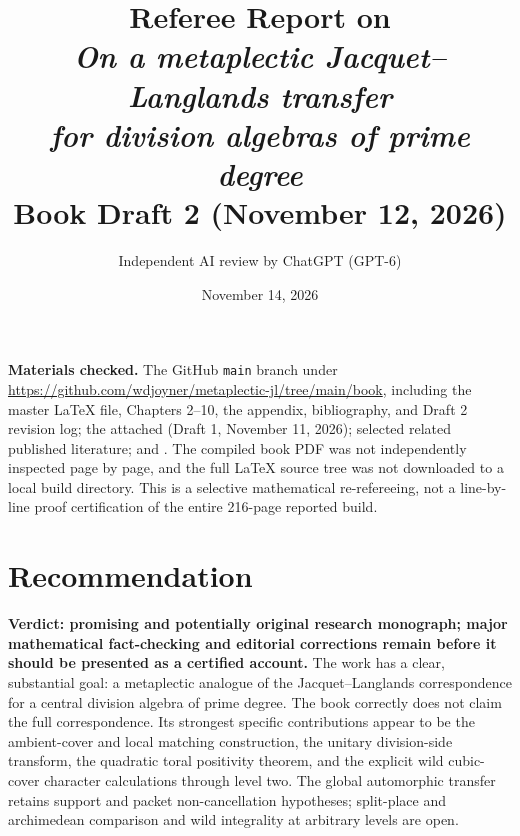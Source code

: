 \documentclass[12pt,letterpaper]{article}
\title{Referee Report on\\\emph{On a metaplectic Jacquet--Langlands transfer\\for division algebras of prime degree}\\[.5em]\large Book Draft 2 (November 12, 2026)}
\author{Independent AI review by ChatGPT (GPT-6)}
\date{November 14, 2026}
\begin{document}
\maketitle
\noindent\textbf{Materials checked.} The GitHub \texttt{main} branch under
\url{https://github.com/wdjoyner/metaplectic-jl/tree/main/book},
including the master LaTeX file, Chapters 2--10, the appendix, bibliography,
and Draft 2 revision log; the attached 
(Draft 1, November 11, 2026); selected related published literature; and
.
The compiled book PDF was not independently inspected page by page, and the
full LaTeX source tree was not downloaded to a local build directory.
This is a selective mathematical re-refereeing, not a line-by-line proof
certification of the entire 216-page reported build.

\section{Recommendation}
\textbf{Verdict: promising and potentially original research monograph;
major mathematical fact-checking and editorial corrections remain before
it should be presented as a certified account.}
The work has a clear, substantial goal: a metaplectic analogue of the
Jacquet--Langlands correspondence for a central division algebra of prime
degree. The book correctly does not claim the full correspondence. Its
strongest specific contributions appear to be the ambient-cover and local
matching construction, the unitary division-side transform, the quadratic
toral positivity theorem, and the explicit wild cubic-cover character
calculations through level two. The global automorphic transfer retains
support and packet non-cancellation hypotheses; split-place and
archimedean comparison and wild integrality at arbitrary levels are open.
\end{document}

